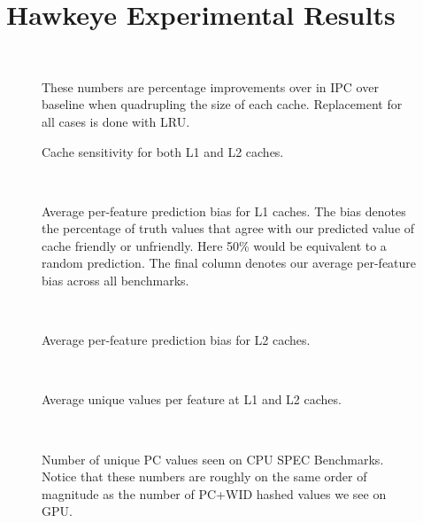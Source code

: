\chapter{Hawkeye Experimental Results}

\begin{figure}[htb]
\begin{center}
\ 
\caption{Cache sensitivity for both L1 and L2 caches.} These numbers are percentage improvements over in IPC over baseline when quadrupling the size of each cache. Replacement for all cases is done with LRU.
\label{f:sensitivity}
\end{center}
\end{figure}

\begin{figure}[htb]
\begin{center}
\ 
\caption{Average per-feature prediction bias for L1 caches. The bias denotes the percentage of truth values that agree with our predicted value of cache friendly or unfriendly. Here 50\% would be equivalent to a random prediction. The final column denotes our average per-feature bias across all benchmarks.}
\label{f:l1_bias}
\end{center}
\end{figure}

\begin{figure}[htb]
\begin{center}
\ 
\caption{Average per-feature prediction bias for L2 caches.}
\label{f:l2_bias}
\end{center}
\end{figure}

\begin{figure}[htb]
\begin{center}
\ 
\caption{Average unique values per feature at L1 and L2 caches.}
\label{f:opt_uniq_vals}
\end{center}
\end{figure}

\begin{figure}[htb]
\begin{center}
\ 
\caption{Number of unique PC values seen on CPU SPEC Benchmarks. Notice that these numbers are roughly on the same order of magnitude as the number of PC+WID hashed values we see on GPU.}
\label{f:cpu_opt_uniq_vals}
\end{center}
\end{figure}

